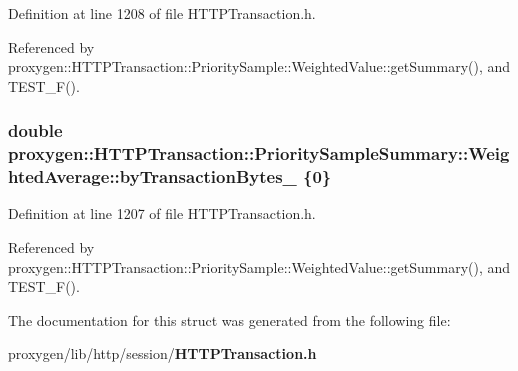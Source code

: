 Definition at line 1208 of file H\+T\+T\+P\+Transaction.\+h.



Referenced by proxygen\+::\+H\+T\+T\+P\+Transaction\+::\+Priority\+Sample\+::\+Weighted\+Value\+::get\+Summary(), and T\+E\+S\+T\+\_\+\+F().

\subsubsection[{by\+Transaction\+Bytes\+\_\+}]{\setlength{\rightskip}{0pt plus 5cm}double proxygen\+::\+H\+T\+T\+P\+Transaction\+::\+Priority\+Sample\+Summary\+::\+Weighted\+Average\+::by\+Transaction\+Bytes\+\_\+ \{0\}}\label{structproxygen_1_1HTTPTransaction_1_1PrioritySampleSummary_1_1WeightedAverage_afe6b9ab950c9bb1a1caded5317e3815a}


Definition at line 1207 of file H\+T\+T\+P\+Transaction.\+h.



Referenced by proxygen\+::\+H\+T\+T\+P\+Transaction\+::\+Priority\+Sample\+::\+Weighted\+Value\+::get\+Summary(), and T\+E\+S\+T\+\_\+\+F().



The documentation for this struct was generated from the following file\+:\begin{DoxyCompactItemize}
\item 
proxygen/lib/http/session/{\bf H\+T\+T\+P\+Transaction.\+h}\end{DoxyCompactItemize}
